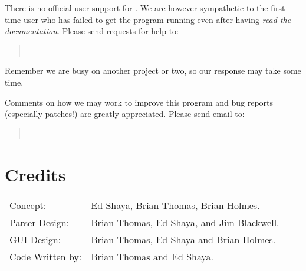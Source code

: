 There is no official user support for \program . We are however 
sympathetic to the first time user who has failed to get the program 
running even after having {\it read the documentation}.
Please send requests for help to:
\begin{quote}
\helpmail\
\end{quote}
Remember we are busy on another project or two, so our response may 
take some time.  

Comments on how we may work to improve this program and bug reports 
(especially patches!) are greatly appreciated. 
Please send email to:
\begin{quote}
\bugmail\
\end{quote}


\section{Credits}

 \begin{center}
  \begin{tabular}{ll} 
 Concept:         & Ed Shaya, Brian Thomas, Brian Holmes. \\ 
 Parser Design:   & Brian Thomas, Ed Shaya, and Jim Blackwell. \\ 
 GUI Design:      & Brian Thomas, Ed Shaya and Brian Holmes. \\ 
 Code Written by: & Brian Thomas and Ed Shaya. \\ 
  \end{tabular}
 \end{center}

